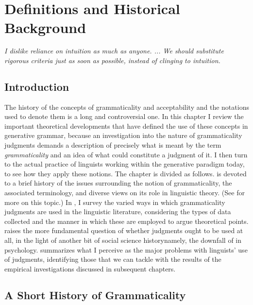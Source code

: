 
\chapter{Definitions and Historical Background}\label{sec:2}

\epigraph{\textit{I dislike reliance on intuition as much as anyone. ... We should substitute rigorous criteria just as soon as possible, instead of clinging to intuition.\\[-2\baselineskip]}}{\citep{Chomsky1962}}

\section{Introduction} \label{sec:2.1}

The history of the concepts of grammaticality and acceptability and the notations used to denote them is a long and controversial one. In this chapter I review the important theoretical developments that have defined the use of these concepts in generative grammar, because an investigation into the nature of grammaticality judgments demands a description of precisely what is meant by the term \textit{grammaticality} and an idea of what could constitute a judgment of it. I then turn to the actual practice of linguists working within the generative paradigm today, to see how they apply these notions. The chapter is divided as follows.  is devoted to a brief history of the issues surrounding the notion of grammaticality, the associated terminology, and diverse views on its role in linguistic theory. (See \citet[ch. 7]{Harris1993} for more on this topic.) In , I survey the varied ways in which grammaticality judgments are used in the linguistic literature, considering the types of data collected and the manner in which these are employed to argue theoretical points.  raises the more fundamental question of whether judgments ought to be used at all, in the light of another bit of social science history\schdash{}namely, the downfall of  in psychology.  summarizes what I perceive as the major problems with linguists' use of judgments, identifying those that we can tackle with the results of the empirical investigations discussed in subsequent chapters.

\section{A Short History of Grammaticality} \label{sec:2.2}

